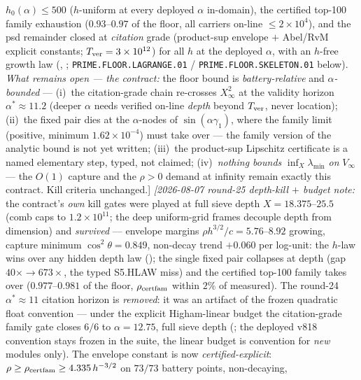 {$h_0(\alpha)\le500$ ($h$-uniform at every deployed $\alpha$
in-domain), the certified top-100 family exhaustion
($0.93$--$0.97$ of the floor, all carriers on-line $\le
2\times10^4$), and the psd remainder closed at \emph{citation}
grade (product-sup envelope $+$ Abel/RvM explicit constants;
$T_{\rm ver}=3\times10^{12}$) for all $h$ at the deployed
$\alpha$, with an $h$-free growth law
(,
;
\texttt{PRIME.FLOOR.LAGRANGE.01} /
\texttt{PRIME.FLOOR.SKELETON.01} below).
\emph{What remains open --- the contract:} the floor bound is
\emph{battery-relative} and \emph{$\alpha$-bounded} --- (i)~the
citation-grade chain re-crosses $X_\infty^2$ at the validity
horizon $\alpha^*\approx11.2$ (deeper $\alpha$ needs verified
on-line \emph{depth} beyond $T_{\rm ver}$, never location);
(ii)~the fixed pair dies at the $\alpha$-nodes of
$\sin(\alpha\gamma_1)$, where the family limit (positive,
minimum $1.62\times10^{-4}$) must take over --- the family
version of the analytic bound is not yet written; (iii)~the
product-sup Lipschitz certificate is a named elementary step,
typed, not claimed; (iv)~\emph{nothing bounds}
$\inf_X\lambda_{\min}$ \emph{on} $V_\infty$ --- the $O(1)$
capture and the $\rho>0$ demand at infinity remain exactly this
contract.  Kill criteria unchanged.]
\emph{[2026-08-07 round-25 depth-kill $+$ budget note:} the
contract's \emph{own} kill gates were played at full sieve depth
$X = 18.375$--$25.5$ (comb caps to $1.2\times10^{11}$; the deep
uniform-grid frames decouple depth from dimension) and
\emph{survived} --- envelope margins $\rho h^{3/2}/c =
5.76$--$8.92$ growing, capture minimum $\cos^2\theta = 0.849$,
non-decay trend $+0.060$ per log-unit: the $h$-law wins over any
hidden depth law (); the
single fixed pair collapses at depth (gap $40\times \to
673\times$, the typed S5.HLAW miss) and the certified top-100
family takes over ($0.977$--$0.981$ of the floor,
$\rho_{\rm certfam}$ within $2\%$ of measured).  The round-24
$\alpha^*\approx11$ citation horizon is \emph{removed}: it was
an artifact of the frozen quadratic float convention --- under
the explicit Higham-linear budget the citation-grade family gate
closes $6/6$ to $\alpha = 12.75$, full sieve depth
(; the deployed v818
convention stays frozen in the suite, the linear budget is
convention for \emph{new} modules only).  The envelope constant
is now \emph{certified-explicit}: $\rho \ge \rho_{\rm certfam}
\ge 4.335\,h^{-3/2}$ on $73/73$ battery points, non-decaying,
}
